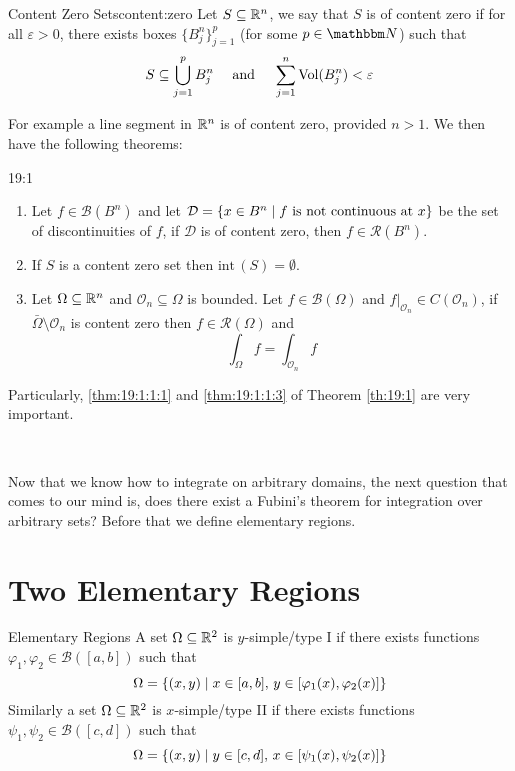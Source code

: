 \documentclass[../Analysis-3.tex]{subfiles}
\begin{document}
\begin{Def}{Content Zero Sets}{content:zero}
  Let $S \subseteq \mathbb{R}^n$, we say that $S$ is of content zero if for all $\varepsilon > 0$, there exists boxes $\{ B_j^n \}_{j=1}^p$ (for some $p \in \N$) such that
  \[
    S \subseteq \bigcup_{j=1}^p B_j^n \quad \mbox{ and } \quad \sum_{j=1}^n \operatorname{Vol}(B^n_j) < \varepsilon
  \]
\end{Def}

For example a line segment in $\mathbb{R}^n$ is of content zero, provided $n > 1$. We then have the following theorems:

\begin{Thm}{}{19:1}
  \begin{enumerate}[label=(\roman*)]
    \item Let $f \in \mathscr{B}(B^n)$ and let $\mathcal{D} = \qty{ x \in B^n \mid f \mbox{ is not continuous at } x }$ be the set of discontinuities of $f$, if $\mathcal{D}$ is of content zero, then $f \in \mathscr{R}(B^n)$. \label{thm:19:1:1:1}

    \item If $S$ is a content zero set then $\mathrm{int}\,(S) = \emptyset$. \label{thm:19:1:1:2}

    \item Let $\Omega \subseteq \mathbb{R}^n$ and $\mathcal{O}_n \subseteq \Omega$ is bounded. Let $f \in \mathscr{B}(\Omega)$ and $f\vert_{\mathcal{O}_n} \in C(\mathcal{O}_n)$, if $\bar{\Omega}\setminus \mathcal{O}_n$ is content zero then $f \in \mathscr{R}(\Omega)$ and
          \[
            \int_{\Omega} f = \int_{\mathcal{O}_n} f
          \] \label{thm:19:1:1:3}
  \end{enumerate}
\end{Thm}
Particularly, \ref{thm:19:1:1:1} and \ref{thm:19:1:1:3} of Theorem \ref{th:19:1} are very important.

\

Now that we know how to integrate on arbitrary domains, the next question that comes to our mind is, does there exist a Fubini's theorem for integration over arbitrary sets? Before that we define elementary regions.

\section{Two Elementary Regions}

\begin{Def}{Elementary Regions}{}
  A set $\Omega \subseteq \mathbb{R}^2$ is $y$-simple/type I if there exists functions $\varphi_1, \varphi_2 \in \mathscr{B}([a,b])$ such that
  \[
    \Omega = \qty{ (x,y) \mid x \in [a,b], \, y \in [\varphi_1(x), \varphi_2(x)] }
  \]
  Similarly a set $\Omega \subseteq \mathbb{R}^2$ is $x$-simple/type II if there exists functions $\psi_1, \psi_2 \in \mathscr{B}([c,d])$ such that
  \[
    \Omega = \qty{ (x,y) \mid y \in [c,d], \, x \in [ \psi_1(x), \psi_2(x) ] }
  \]
\end{Def}
\end{document}
